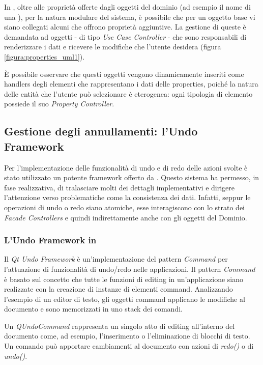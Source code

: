 In \visualnetkit{}, oltre alle proprietà offerte dagli oggetti del dominio (ad esempio il nome di una \virtualmachine{}), per la natura modulare del sistema, è possibile che per un oggetto base vi siano collegati alcuni \plugin{} che offrono proprietà aggiuntive.
La gestione di queste è demandata ad oggetti - di tipo \emph{Use Case Controller} - che sono responsabili di renderizzare i dati e ricevere le modifiche che l'utente desidera (figura \ref{figura:properties_uml1}).

È possibile osservare che questi oggetti vengono dinamicamente inseriti come handlers degli elementi che rappresentano i dati delle properties, poiché la natura delle entità che l'utente può selezionare è eterogenea: ogni tipologia di elemento possiede il suo \emph{Property Controller}.

\subsection{Gestione degli annullamenti: l'Undo Framework}
Per l'implementazione delle funzionalità di undo e di redo delle azioni svolte è stato utilizzato un potente framework offerto da \qt{}. Questo sistema ha permesso, in fase realizzativa, di tralasciare molti dei dettagli implementativi e dirigere l'attenzione verso problematiche come la consistenza dei dati. Infatti, seppur le operazioni di undo o redo siano atomiche, esse interagiscono con lo strato dei \emph{Facade Controllers} e quindi indirettamente anche con gli oggetti del Dominio.

\subsubsection*{L'Undo Framework in \qt{}}
Il \emph{Qt Undo Framework} è un'implementazione del pattern \emph{Command}\cite{AUPL04} per l'attuazione di funzionalità di undo/redo nelle applicazioni.
Il pattern \emph{Command} è basato sul concetto che tutte le funzioni di editing in un'applicazione siano realizzate con la creazione di instanze di elementi command. Analizzando l'esempio di un editor di testo, gli oggetti command applicano le modifiche al documento e sono memorizzati in uno stack dei comandi.

Un \emph{QUndoCommand} rappresenta un singolo atto di editing all'interno del documento come, ad esempio, l'inserimento o l'eliminazione di blocchi di testo. Un comando può apportare cambiamenti al documento con azioni di \emph{redo()} o di \emph{undo()}.

